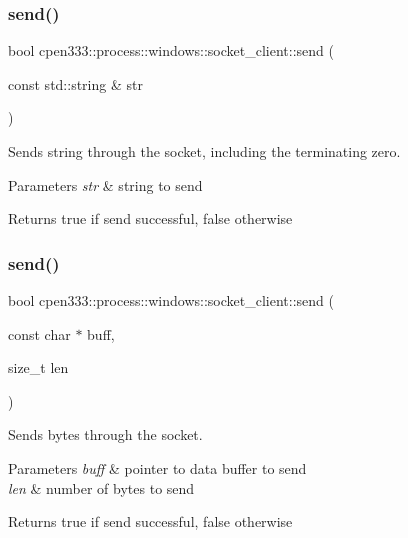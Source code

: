 \subsubsection{\texorpdfstring{send()}{send()}\hspace{0.1cm}{\footnotesize\ttfamily [1/2]}}
{\footnotesize\ttfamily bool cpen333\+::process\+::windows\+::socket\+\_\+client\+::send (\begin{DoxyParamCaption}\item[{const std\+::string \&}]{str }\end{DoxyParamCaption})\hspace{0.3cm}{\ttfamily [inline]}}



Sends string through the socket, including the terminating zero. 


\begin{DoxyParams}{Parameters}
{\em str} & string to send \\
\hline
\end{DoxyParams}
\begin{DoxyReturn}{Returns}
true if send successful, false otherwise 
\end{DoxyReturn}
\mbox{\label{classcpen333_1_1process_1_1windows_1_1socket__client_aa365c3943cf245092dba651034288dfd}} 
\subsubsection{\texorpdfstring{send()}{send()}\hspace{0.1cm}{\footnotesize\ttfamily [2/2]}}
{\footnotesize\ttfamily bool cpen333\+::process\+::windows\+::socket\+\_\+client\+::send (\begin{DoxyParamCaption}\item[{const char $\ast$}]{buff,  }\item[{size\+\_\+t}]{len }\end{DoxyParamCaption})\hspace{0.3cm}{\ttfamily [inline]}}



Sends bytes through the socket. 


\begin{DoxyParams}{Parameters}
{\em buff} & pointer to data buffer to send \\
\hline
{\em len} & number of bytes to send \\
\hline
\end{DoxyParams}
\begin{DoxyReturn}{Returns}
true if send successful, false otherwise 
\end{DoxyReturn}


